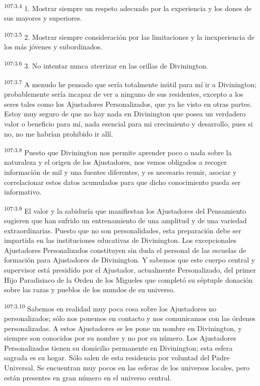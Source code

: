 \documentclass[twoside, 11pt]{book}
\begin{document}
\par
\textsuperscript{107:3.4} 1. Mostrar siempre un respeto adecuado por la experiencia y los dones de sus mayores y superiores.

\par
\textsuperscript{107:3.5} 2. Mostrar siempre consideración por las limitaciones y la inexperiencia de los más jóvenes y subordinados.

\par
\textsuperscript{107:3.6} 3. No intentar nunca aterrizar en las orillas de Divinington.

\par
\textsuperscript{107:3.7} A menudo he pensado que sería totalmente inútil para mí ir a Divinington; probablemente sería incapaz de ver a ninguno de sus residentes, excepto a los seres tales como los Ajustadores Personalizados, que ya he visto en otras partes. Estoy muy seguro de que no hay nada en Divinington que posea un verdadero valor o beneficio para mí, nada esencial para mi crecimiento y desarrollo, pues si no, no me habrían prohibido ir allí.

\par
\textsuperscript{107:3.8} Puesto que Divinington nos permite aprender poco o nada sobre la naturaleza y el origen de los Ajustadores, nos vemos obligados a recoger información de mil y una fuentes diferentes, y es necesario reunir, asociar y correlacionar estos datos acumulados para que dicho conocimiento pueda ser informativo.

\par
\textsuperscript{107:3.9} El valor y la sabiduría que manifiestan los Ajustadores del Pensamiento sugieren que han sufrido un entrenamiento de una amplitud y de una variedad extraordinarias. Puesto que no son personalidades, esta preparación debe ser impartida en las instituciones educativas de Divinington. Los excepcionales Ajustadores Personalizados constituyen sin duda el personal de las escuelas de formación para Ajustadores de Divinington. Y sabemos que este cuerpo central y supervisor está presidido por el Ajustador, actualmente Personalizado, del primer Hijo Paradisiaco de la Orden de los Migueles que completó su séptuple donación sobre las razas y pueblos de los mundos de su universo.

\par
\textsuperscript{107:3.10} Sabemos en realidad muy poca cosa sobre los Ajustadores no personalizados; sólo nos ponemos en contacto y nos comunicamos con las órdenes personalizadas. A estos Ajustadores se les pone un nombre en Divinington, y siempre son conocidos por su nombre y no por su número. Los Ajustadores Personalizados tienen su domicilio permanente en Divinington; esta esfera sagrada es su hogar. Sólo salen de esta residencia por voluntad del Padre Universal. Se encuentran muy pocos en las esferas de los universos locales, pero están presentes en gran número en el universo central.
\end{document}
